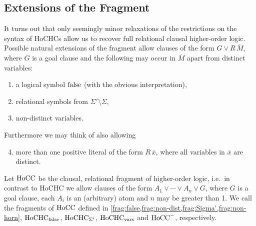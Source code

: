 \documentclass[a4paper,twoside,notitlepage,openright,11pt]{report}
\begin{document}
\subsection{Extensions of the Fragment}
It turns out that only seemingly minor relaxations of the restrictions on the syntax of HoCHCs allow us to recover full relational clausal higher-order logic.
Possible natural extensions of the fragment allow clauses of the form $G\lor R\,\overline M$, where $G$ is a goal clause and the following may occur in $\overline M$ apart from distinct variables:
\begin{enumerate}[noitemsep]
\item\label{frag:false} a logical symbol $\operatorname{false}$ (with the obvious interpretation),
\item\label{frag:Sigma'} relational symbols from $\Sigma'\setminus\Sigma$,
\item\label{frag:non-dist} non-distinct variables.
\end{enumerate}
Furthermore we may think of also allowing
\begin{enumerate}
  \setcounter{enumi}{3}
\item\label{frag:non-horn} more than one positive literal of the form $R\,\overline x$, where all variables in $\overline x$ are distinct.
\end{enumerate}
Let $\operatorname{HoCC}$ be the clausal, relational fragment of higher-order logic, i.e.\ in contrast to HoCHC we allow clauses of the form $A_1\lor\cdots\lor A_n\lor G$, where $G$ is a goal clause, each $A_i$ is an (arbitrary) atom and $n$ may be greater than 1. We call the fragments of $\operatorname{HoCC}$ defined in \cref{frag:false,frag:non-dist,frag:Sigma',frag:non-horn}, $\operatorname{HoCHC}_{\operatorname{false}}$, $\operatorname{HoCHC}_{\Sigma'}$, $\operatorname{HoCHC}_{\operatorname{vars}}$ and $\operatorname{HoCC}^-$, respectively.
\end{document}
